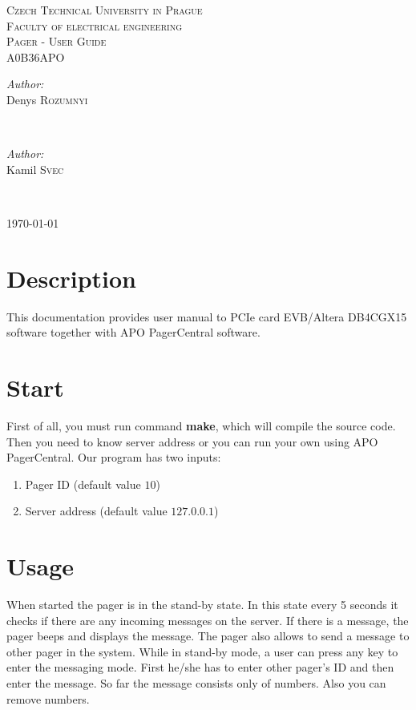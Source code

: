 \documentclass[12pt]{article}
\begin{document}
\begin{center}
\textsc{\LARGE Czech Technical University in Prague}\\[0.5cm]
\textsc{\Large Faculty of electrical engineering}\\[0.5cm]
\textsc{\Large Pager - User Guide}\\[0.5cm]
\textsc{\large A0B36APO}\\[0.5cm]

\begin{minipage}{0.4\textwidth}
\begin{flushleft} \large
\emph{Author:}\\
Denys \textsc{Rozumnyi} 
\end{flushleft}
\end{minipage}
~
\begin{minipage}{0.4\textwidth}
\begin{flushright} \large
\emph{Author:} \\
Kamil \textsc{Svec}
\end{flushright}
\end{minipage}\\[0.5cm]


\begin{center}
{\large \today}
\end{center}
\end{center}

\section{Description}
This documentation provides user manual to PCIe card EVB/Altera DB4CGX15 software together with APO PagerCentral software. 

\section{Start}
First of all, you must run command \textbf{make}, which will compile the source code. Then you need to know server address or you can run your own using APO PagerCentral. Our program has two inputs:
\begin{enumerate}
\item Pager ID (default value $10$)
\item Server address (default value $127.0.0.1$)
\end{enumerate} 

\section{Usage}
When started the pager is in the stand-by state. In this state every 5 seconds it checks if there are any incoming messages on the server. If there is a message, the pager beeps and displays the message. The pager also allows to send a message to other pager in the system. While in stand-by mode, a user can press any key to enter the messaging mode. First he/she has to enter other pager's ID and then enter the message. So far the message consists only of numbers. Also you can remove numbers. 
\end{document}
